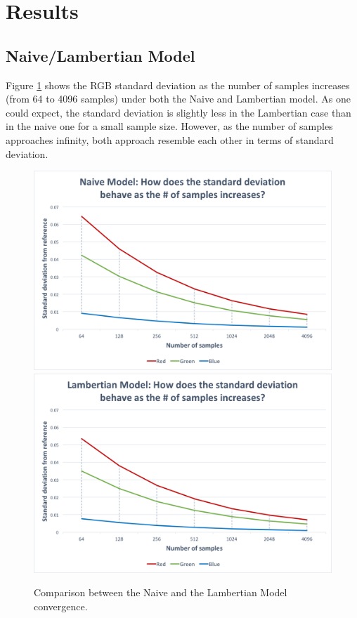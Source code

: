 \documentclass{article}
\begin{document}
\section*{Results}

\subsection*{Naive/Lambertian Model}
Figure \ref{fig:lamb} shows the RGB standard deviation as the number of samples increases (from 64 to 4096 samples) under both the Naive and Lambertian model. As one could expect, the standard deviation is slightly less in the Lambertian case than in the naive one for a small sample size. However, as the number of samples approaches infinity, both approach resemble each other in terms of standard deviation.

\begin{figure}[p]
\centering
\includegraphics[width=\textwidth]{assets/naive_stdev}
\\
\includegraphics[width=\textwidth]{assets/lamb_stdev}

\caption{Comparison between the Naive and the Lambertian Model convergence.}
\label{fig:lamb}
\end{figure}
\end{document}
